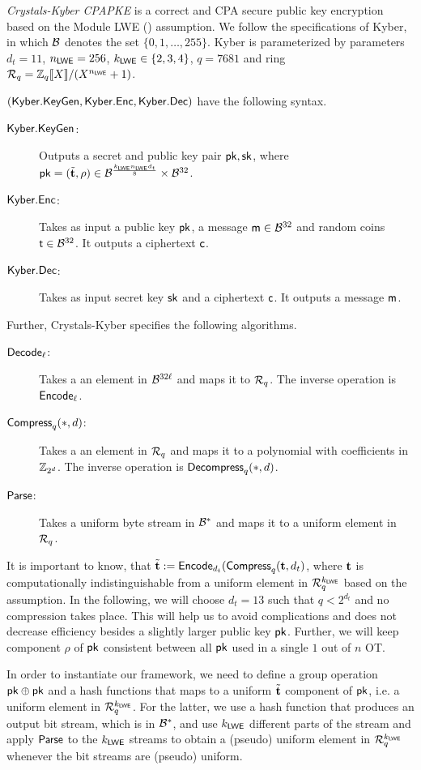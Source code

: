 \begin{definition}
\emph{ Crystals-Kyber CPAPKE} is a correct and CPA secure public key encryption based on the Module LWE (\MLWE) assumption. We follow the specifications of Kyber, in which $\mathcal{B}$ denotes the  set $\{0,1,\ldots,255\}$. Kyber is parameterized by parameters $d_t=11$, $n_{\mathsf{LWE}}=256$, $k_{\mathsf{LWE}}\in\{2,3,4\}$, $q=7681$ and ring $\mathcal R_q=\mathbb Z_q\llbracket X\rrbracket/(X^{n_{\mathsf{LWE}}}+1)$. 

$(\mathsf{Kyber.KeyGen},\mathsf{Kyber.Enc},\mathsf{Kyber.Dec})$ have the following syntax. 
\begin{description}
\item[$\mathsf{Kyber.KeyGen}$:] Outputs a secret and public key pair $\mathsf{pk},\mathsf{sk}$, where $\mathsf{pk}=(\tilde{{\mathbf t}},\rho)\in\mathcal{B}^{\frac{k_{\mathsf{LWE}}n_{\mathsf{LWE}} d_t}{8}}\times\mathcal{B}^{32}$.
\item[$\mathsf{Kyber.Enc}$:] Takes as input a public key $\mathsf{pk}$, a message $\mathsf{m}\in\mathcal{B}^{32}$ and random coins $\mathsf{t}\in\mathcal{B}^{32}$. It outputs a ciphertext $\mathsf{c}$.
\item[$\mathsf{Kyber.Dec}$:] Takes as input secret key $\mathsf{sk}$ and a ciphertext $\mathsf{c}$. It outputs a message $\mathsf{m}$.
\end{description}
Further, Crystals-Kyber specifies the following algorithms.
\begin{description}
\item[$\mathsf{Decode}_\ell$:] Takes a an element in $\mathcal{B}^{32\ell}$ and maps it to $\mathcal R_q$. The inverse operation is $\mathsf{Encode}_\ell$.
\item[$\mathsf{Compress}_q(*,d)$:] Takes a an element in $\mathcal R_q$ and maps it to a polynomial with coefficients in $\mathbb Z_{2^d}$. The inverse operation is $\mathsf{Decompress}_q(*,d)$.
\item[$\mathsf{Parse}$:] Takes a uniform byte stream in $\mathcal{B}^{*}$ and maps it to a uniform element in $\mathcal R_q$.
\end{description}
\end{definition}

It is important to know, that $\tilde{{\mathbf t}}:=\mathsf{Encode}_{d_t}(\mathsf{Compress}_q({\mathbf t}, d_t)$, where ${\mathbf t}$ is computationally indistinguishable from a uniform element in $\mathcal R_q^{k_{\mathsf{LWE}}}$ based on the \MLWE assumption. In the following, we will choose $d_t=13$ such that $q<2^{d_t}$ and no compression takes place. This will help us to avoid complications and does not decrease efficiency besides a slightly larger public key $\mathsf{pk}$. Further, we will keep component $\rho$ of $\mathsf{pk}$ consistent between all $\mathsf{pk}$ used in a single $1$ out of $n$ OT.

In order to instantiate our framework, we need to define a group operation $\mathsf{pk}\oplus\mathsf{pk}$ and a hash functions that maps to a uniform $\tilde{{\mathbf t}}$ component of $\mathsf{pk}$, i.e. a uniform element in $\mathcal R_q^{k_{\mathsf{LWE}}}$. For the latter, we use a hash function that produces an output bit stream, which is in $\mathcal{B}^{*}$, and use $k_{\mathsf{LWE}}$ different parts of the stream and apply $\mathsf{Parse}$ to the $k_{\mathsf{LWE}}$ streams to obtain a (pseudo) uniform element in $\mathcal R_q^{k_{\mathsf{LWE}}}$ whenever the bit streams are (pseudo) uniform.

